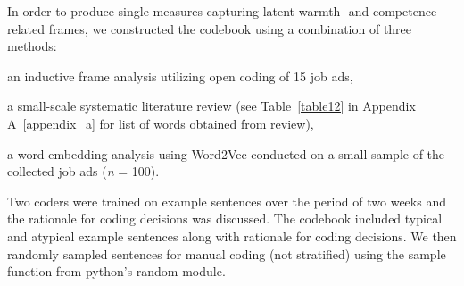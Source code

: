 \documentclass[jou]{apa7}
\begin{document}
In order to produce single measures capturing latent warmth- and competence-related frames, we constructed the codebook using a combination of three methods:
\begin{seriate}
    \item an inductive frame analysis utilizing open coding of 15 job ads,
    \item a small-scale systematic literature review (see Table~\ref{table12} in Appendix A~\ref{appendix_a} for list of words obtained from review),
    \item a word embedding analysis using Word2Vec conducted on a small sample of the collected job ads (\textit{n} = 100).
    \end{seriate}
Two coders were trained on example sentences over the period of two weeks and the rationale for coding decisions was discussed. The codebook included typical and atypical example sentences along with rationale for coding decisions. We then randomly sampled sentences for manual coding (not stratified) using the sample function from python’s random module.

\end{document}
